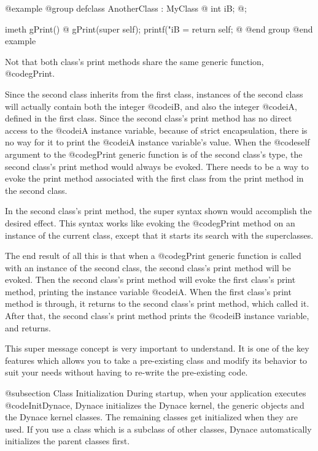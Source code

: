 @example
@group
defclass  AnotherClass : MyClass  @{
        int     iB;
@};

imeth   gPrint()
@{
        gPrint(super self);
        printf("iB = %
        return self;
@}
@end group
@end example

Not that both class's print methods share the same generic function,
@code{gPrint}.

Since the second class inherits from the first class, instances of the
second class will actually contain both the integer @code{iB}, and also
the integer @code{iA}, defined in the first class.  Since the second
class's print method has no direct access to the @code{iA} instance
variable, because of strict encapsulation, there is no way for it to
print the @code{iA} instance variable's value.  When the @code{self}
argument to the @code{gPrint} generic function is of the second class's
type, the second class's print method would always be evoked.  There needs
to be a way to evoke the print method associated with the first class from
the print method in the second class.

In the second class's print method, the super syntax shown would
accomplish the desired effect.  This syntax works like evoking the
@code{gPrint} method on an instance of the current class, except that it
starts its search with the superclasses.

The end result of all this is that when a @code{gPrint} generic function is
called with an instance of the second class, the second class's print method
will be evoked.  Then the second class's print method will evoke the first
class's print method, printing the instance variable @code{iA}.  When the
first class's print method is through, it returns to the second class's
print method, which called it.  After that, the second class's print
method prints the @code{iB} instance variable, and returns.

This super message concept is very important to understand.  It is one
of the key features which allows you to take a pre-existing class and
modify its behavior to suit your needs without having to re-write the
pre-existing code.

@subsection Class Initialization
During startup, when your application executes @code{InitDynace},
Dynace initializes the Dynace kernel, the generic objects and
the Dynace kernel classes.  The remaining classes get initialized
when they are used.  If you use a class which is a subclass of
other classes, Dynace automatically initializes the parent classes
first.

